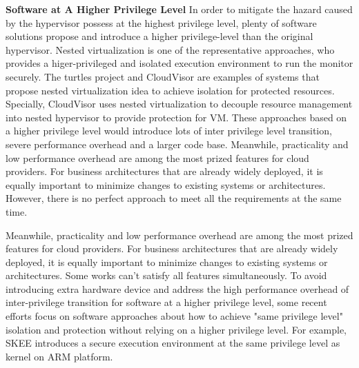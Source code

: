 \documentclass[conference]{IEEEtran}
\begin{document}
 
\textbf{Software at A Higher Privilege Level}
In order to mitigate the hazard caused by the hypervisor possess at the highest privilege level, plenty of software solutions propose and introduce a higher privilege-level than the original hypervisor. Nested virtualization is one of the representative approaches, who provides a higer-privileged and isolated 
execution environment to run the monitor securely. The turtles project \cite{Ben2007The} and CloudVisor \cite{Zhang2011CloudVisor} are examples of systems that propose nested virtualization idea to achieve isolation for protected resources. Specially, CloudVisor uses nested virtualization to decouple 
resource management into nested hypervisor to provide protection for VM. These approaches based on a higher privilege level would introduce lots of inter privilege level transition, severe performance overhead and a larger code base.
Meanwhile, practicality and low performance overhead are among the most prized features for cloud providers. For business architectures that are already widely deployed, it is equally important to minimize changes to existing systems or architectures. However, there is no perfect approach to meet all the requirements at the same time.

Meanwhile, practicality and low performance overhead are among the most prized features for cloud providers. For business architectures that are already widely deployed, it is equally important to minimize changes to existing systems or architectures. Some works can't satisfy all features simultaneously. To avoid introducing extra hardware device and address the high performance overhead of inter-privilege transition for software at a higher privilege level, some recent efforts focus on software approaches about how to achieve "same privilege level" isolation and protection without relying on a higher privilege level. For example, SKEE\cite{Azab2016SKEE} introduces a secure execution environment at the same privilege level as kernel on ARM platform. 
\end{document}
